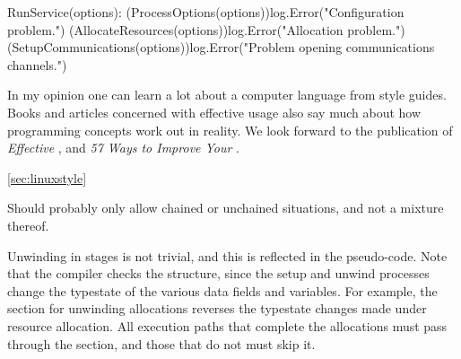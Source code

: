 \documentclass[10pt]{amsart}
\begin{document}
\begin{codex}
\begin{offsideBlue}
\begin{PVerbatim}
  \ckw[function] RunService(options):
     \ckw[when] (ProcessOptions(options))\cop[:]
        log.Error("Configuration problem.")
        \cgoto\csituation[OptionsProblem]
     \cend
     \ckw[when] (AllocateResources(options))\cop[:]
        log.Error("Allocation problem.")
        \cgoto\csituation[AllocationProblem]
     \cend
     \ckw[when] (SetupCommunications(options))\cop[:]
        log.Error("Problem opening communications channels.")
        \cgoto\csituation[CommunicationsProblem]
     \cend


     \ckw[continue]
  \csitop\csituation[CommunicationsProblem]\cop[:]
     \ckw[continue]
  \csitop\csituation[AllocationProblem]\cop[:]
     \ckw[continue]
  \csitop\csituation[OptionsProblem]\cop[:]
  \cend
\end{PVerbatim}
\end{offsideBlue}
\end{codex}

In my opinion one can learn a lot about a computer language from style
guides.  Books and articles concerned with effective usage also say
much about how programming concepts work out in reality.  We look
forward to the publication of \emph{Effective \Utop}, and \emph{57
  Ways to Improve Your \Utop}.

\ref{sec:linuxstyle}

Should probably only allow chained or unchained situations, and not a
mixture thereof.

Unwinding in stages is not trivial, and this is reflected in the
pseudo-code.  Note that the \Utop compiler checks the structure, since
the setup and unwind processes change the typestate of the various
data fields and variables.  For example, the section for unwinding
allocations reverses the typestate changes made under resource
allocation.  All execution paths that complete the allocations must
pass through the section, and those that do not must skip it.
\end{document}
